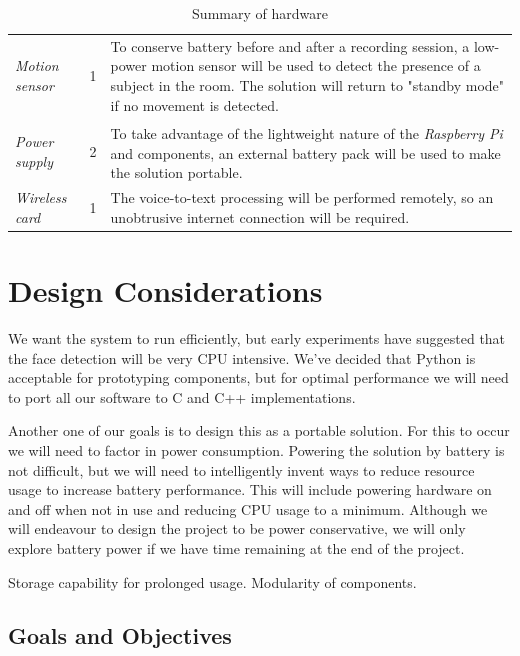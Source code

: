 \documentclass[11pt,a4paper,titlepage]{report}
\newcommand{\rpi}{\textit{Raspberry Pi\textsuperscript{\textregistered}}}
\begin{document}
\begin{center}
\begin{table}
{\begin{tabu}{ lcp{7cm} }
    \textit{Motion sensor} & 1 & To conserve battery before and after a recording session, a low-power motion sensor will be used to detect the presence of a subject in the room. The solution will return to "standby mode" if no movement is detected.\\ 

    \textit{Power supply} & 2 & To take advantage of the lightweight nature of the \rpi\xspace and components, an external battery pack will be used to make the solution portable.\\ 


    \textit{Wireless card} & 1 & The voice-to-text processing will be performed remotely, so an unobtrusive internet connection will be required.\\ \hline
    
\end{tabu} }
\caption{Summary of hardware}
\label{table:hardwaretable}
\end{table}

\end{center}

\section{Design Considerations}

We want the system to run efficiently, but early experiments have suggested that the face detection will be very CPU intensive. We've decided that Python is acceptable for prototyping components, but for optimal performance we will need to port all our software to C and C++ implementations.

Another one of our goals is to design this as a portable solution. For this to occur we will need to factor in power consumption. Powering the solution by battery is not difficult, but we will need to intelligently invent ways to reduce resource usage to increase battery performance. This will include powering hardware on and off when not in use and reducing CPU usage to a minimum. Although we will endeavour to design the project to be power conservative, we will only explore  battery power if we have time remaining at the end of the project. 

{\color{red} Storage capability for prolonged usage. Modularity of components. }


\subsection{Goals and Objectives}
\end{document}
